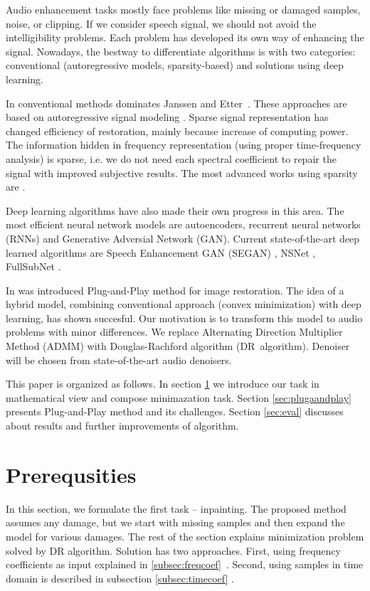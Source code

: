 \documentclass[conference]{IEEEtran}
\begin{document}
Audio enhancement tasks mostly face problems like missing or damaged samples, noise, or clipping.
If we consider speech signal, we should not avoid the intelligibility problems.
Each problem has developed its own way of enhancing the signal.
Nowadays, the bestway to differentiate algorithms is with two categories:
conventional (autoregressive models, sparsity-based) and solutions using deep learning.

In conventional methods dominates Janssen \cite{Janssen1986} and Etter~\cite{Etter1996}.
These approaches are based on autoregressive signal modeling \cite{Mokry2020}.
Sparse signal representation has changed efficiency of restoration, mainly because increase of computing power.
The information hidden in frequency representation (using proper time-frequency analysis) is sparse, i.e. we do not need each spectral coefficient to repair the signal with improved subjective results.
The most advanced works using sparsity are \cite{Adler2012,Kitic2015,Zaviska2019, Mokry2019}.


Deep learning algorithms have also made their own progress in this area.
The most efficient neural network models are autoencoders,
recurrent neural networks (RNNs) and
Generative Adversial Network (GAN).
Current state-of-the-art deep learned algorithms are Speech Enhancement GAN (SEGAN) \cite{Pascual2017}, NSNet \cite{Xia2020}, FullSubNet \cite{Hao2021}. 

In \cite{Chan2016} was introduced Plug-and-Play method for image restoration.
The idea of a hybrid model,
combining conventional approach (convex minimization) with deep learning,
has shown succesful.
Our motivation is to transform this model to audio problems with minor differences.
We replace Alternating Direction Multiplier Method (ADMM) with Douglas-Rachford algorithm (DR~algorithm).
Denoiser will be chosen from state-of-the-art audio denoisers. 

This paper is organized as follows. In section \ref{sec:prereq} we introduce our task in mathematical view and compose minimazation task.
Section \ref{sec:plugaandplay}  presents Plug-and-Play method and its challenges.
Section \ref{sec:eval} discusses about results and further improvements of algorithm.

\section{Prerequsities}\label{sec:prereq} 

In this section, we formulate the first task -- inpainting.
The proposed method \cite{Chan2016} assumes any damage,
but we start with missing samples and then expand the model for various damages.
The rest of the section explains minimization problem solved by DR algorithm.
Solution has two approaches.
First, using frequency coefficients as input explained in \ref{subsec:freqcoef}~\cite{Mokry2020}.
Second, using samples in time domain is described in subsection \ref{subsec:timecoef} \cite{Mokry2021}.
\end{document}
